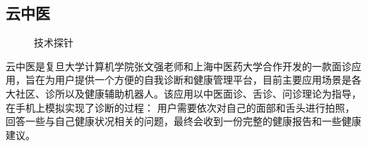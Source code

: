 \subsection{云中医}

\begin{figure}[h]
    \centering
    \caption{技术探针}
    \label{fig:main}
\end{figure}
云中医是复旦大学计算机学院张文强老师和上海中医药大学合作开发的一款面诊应用，旨在为用户提供一个方便的自我诊断和健康管理平台，目前主要应用场景是各大社区、诊所以及健康辅助机器人。该应用以中医面诊、舌诊、问诊理论为指导，在手机上模拟实现了诊断的过程：
用户需要依次对自己的面部和舌头进行拍照，回答一些与自己健康状况相关的问题，最终会收到一份完整的健康报告和一些健康建议。

